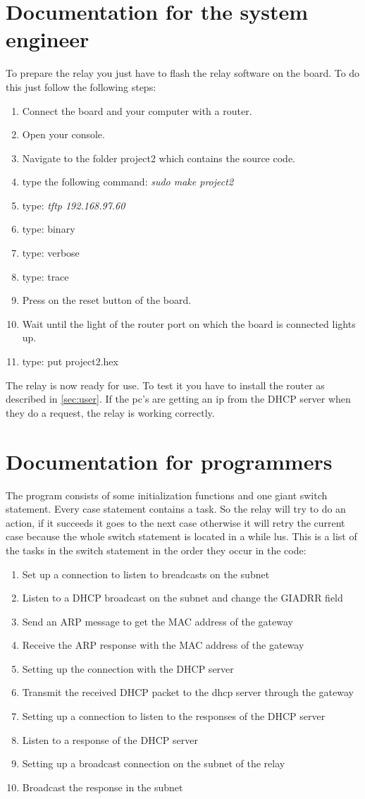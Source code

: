 \documentclass[a4]{article}
\begin{document}
\section{Documentation for the system engineer}
\label{sec:engineer}
To prepare the relay you just have to flash the relay software on the board. To do this just follow the following steps:
\begin{enumerate}
\item Connect the board and your computer with a router.
\item Open your console.
\item Navigate to the folder project2 which contains the source code.
\item type the following command: \textit{sudo make project2}
\label{itm:command}
\item type: \textit{tftp 192.168.97.60}
\item type: binary
\item type: verbose
\item type: trace
\item Press on the reset button of the board.
\item Wait until the light of the router port on which the board is connected lights up.
\item type: put project2.hex
\end{enumerate}
The relay is now ready for use. To test it you have to install the router as described in \ref{sec:user}. If the pc's are getting an ip from the DHCP server when they do a request, the relay is working correctly.
\section{Documentation for programmers}
The program consists of some initialization functions and one giant switch statement. Every case statement contains a task. So the relay will try to do an action, if it succeeds it goes to the next case otherwise it will retry the current case because the whole switch statement is located in a while lus. This is a list of the tasks in the switch statement in the order they occur in the code:
\begin{enumerate}
\item Set up a connection to listen to breadcasts on the subnet
\item Listen to a DHCP broadcast on the subnet and change the GIADRR field
\item Send an ARP message to get the MAC address of the gateway
\item Receive the ARP response with the MAC address of the gateway
\item Setting up the connection with the DHCP server
\item Transmit the received DHCP packet to the dhcp server through the gateway
\item Setting up a connection to listen to the responses of the DHCP server
\item Listen to a response of the DHCP server
\item Setting up a broadcast connection on the subnet of the relay
\item Broadcast the response in the subnet
\end{enumerate}
\end{document}
